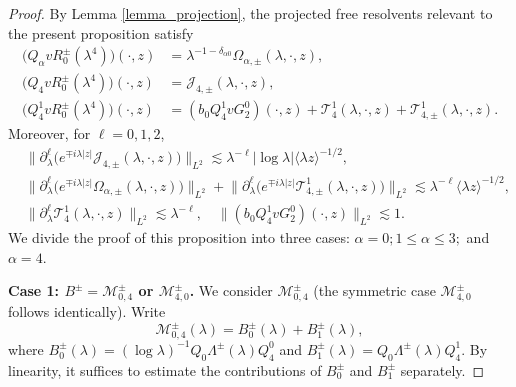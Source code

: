 \documentclass[reqno]{amsart}
\numberwithin{equation}{section}
\begin{document}
\begin{proof}
	By Lemma \ref{lemma_projection}, the projected free resolvents relevant
	to the present proposition satisfy
	\begin{align}
		\bigl(Q_\alpha vR_0^\pm(\lambda^4)\bigr)(\cdot,z)
		&=
		\lambda^{-1-\delta_{\alpha0}}
		\Omega_{\alpha,\pm}(\lambda,\cdot,z),
		\label{Qalpha}\\
		\bigl(Q_4vR_0^\pm(\lambda^4)\bigr)(\cdot,z)
		&=
		\mathcal{J}_{4,\pm}(\lambda,\cdot,z),
		\label{De all Q}\\
		\bigl(Q_4^1vR_0^\pm(\lambda^4)\bigr)(\cdot,z)
		&=
		(b_0Q_4^1vG_2^0)(\cdot,z)
		+
		\mathcal{T}_4^1(\lambda,\cdot,z)
		+
		\mathcal{T}_{4,\pm}^1(\lambda,\cdot,z).
		\label{eq:resolvent_decomp-Q4}
	\end{align}
	Moreover, for $\ell=0,1,2$,
	\begin{equation}
		\begin{split}
			&	\big\|
			\partial_\lambda^\ell
			\bigl(
			e^{\mp i\lambda|z|}
			\mathcal{J}_{4,\pm}(\lambda,\cdot,z)
			\bigr) 
			\big\|_{L^2} \lesssim 
			\lambda^{-\ell} 	|\log\lambda|
			\langle\lambda z\rangle^{-1/2},\\
		&
		\big\|
		\partial_\lambda^\ell
		\bigl(
		e^{\mp i\lambda|z|}
		\Omega_{\alpha,\pm}(\lambda,\cdot,z)
		\bigr)
		\big\|_{L^2}
		+
		\big\|
		\partial_\lambda^\ell
		\bigl(
		e^{\mp i\lambda|z|}
		\mathcal{T}_{4,\pm}^1(\lambda,\cdot,z)
		\bigr)
		\big\|_{L^2}
		\lesssim
		\lambda^{-\ell}
		\langle\lambda z\rangle^{-1/2},\\
	&	\|
		\partial_\lambda^\ell
		\mathcal{T}_4^1(\lambda,\cdot,z)
		\|_{L^2}
		\lesssim
		\lambda^{-\ell},\quad 	\|(b_0Q_4^1vG_2^0)(\cdot,z)\|_{L^2}
		\lesssim1.
		\label{eq:E_bound-1}
		\end{split}
	\end{equation}
	We divide the proof of this proposition into three cases: $\alpha=0; 1\leq\alpha\leq3;$ and $\alpha=4.$

	\medskip
	
	
	\textbf{Case 1: $B^\pm=\mathcal{M}_{0,4}^\pm$ or
		$\mathcal{M}_{4,0}^\pm$.}
	We consider $\mathcal{M}_{0,4}^\pm$  (the symmetric case $\mathcal{M}_{4,0}^{\pm}$ follows identically). Write
	$$
	\mathcal{M}_{0,4}^\pm(\lambda)
	=
	B_0^\pm(\lambda)+B_1^\pm(\lambda),
	$$
	where
	$
	B_0^\pm(\lambda)
	=
	(\log\lambda)^{-1}
	Q_0\Lambda^\pm(\lambda)Q_4^0$
	and $
	B_1^\pm(\lambda)
	=
	Q_0\Lambda^\pm(\lambda)Q_4^1.
	$ 	By linearity, it suffices to estimate the contributions of
	$B_0^\pm$ and $B_1^\pm$ separately.
	

\end{proof}
\end{document}
